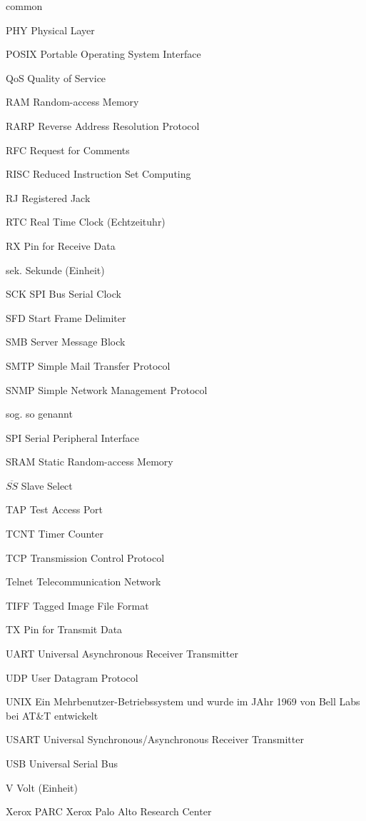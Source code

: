 \begin{bfscript}{common}
	\item[PHY] Physical Layer
	\item[POSIX] Portable Operating System Interface

	\item[QoS] Quality of Service

	\item[RAM] Random-access Memory
	\item[RARP] Reverse Address Resolution Protocol
	\item[RFC] Request for Comments
	\item[RISC] Reduced Instruction Set Computing
	\item[RJ] Registered Jack
	\item[RTC] Real Time Clock (Echtzeituhr)
	\item[RX] Pin for Receive Data

	\item[sek.] Sekunde (Einheit)
	\item[SCK] SPI Bus Serial Clock
	\item[SFD] Start Frame Delimiter
	\item[SMB] Server Message Block
	\item[SMTP] Simple Mail Transfer Protocol
	\item[SNMP] Simple Network Management Protocol
	\item[sog.] so genannt
	\item[SPI] Serial Peripheral Interface
	\item[SRAM] Static Random-access Memory
	\item[$\overline{SS}$] Slave Select 

	\item[TAP] Test Access Port
	\item[TCNT] Timer Counter
	\item[TCP] Transmission Control Protocol
	\item[Telnet] Telecommunication Network
	\item[TIFF] Tagged Image File Format
	\item[TX] Pin for Transmit Data

	\item[UART] Universal Asynchronous Receiver Transmitter
	\item[UDP] User Datagram Protocol
	\item[UNIX] Ein Mehrbenutzer-Betriebssystem und wurde im JAhr 1969 von Bell Labs bei AT\&T entwickelt
	\item[USART] Universal Synchronous/Asynchronous Receiver Transmitter
	\item[USB] Universal Serial Bus
	
	\item[V] Volt (Einheit)
 
	\item[Xerox PARC] Xerox Palo Alto Research Center

\end{bfscript}

